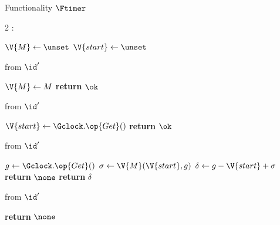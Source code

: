 \begin{interface}[nofloat]{Functionality $\Ftimer$ \\
}

{\scriptsize
\setlength{\columnsep}{1.4em}
\begin{multicols}{2}
:
\begin{algorithmic}[1]
\setcounter{contline}{0}\algcont
\State $\V{M} \gets \unset$
\State $\V{start} \gets \unset$
\algsave
\end{algorithmic}
\vspace{1.4ex}

 \quad from $\id'$
\begin{algorithmic}[1]
\algcont
{} \label{ln:tmrenvonly}
\State $\V{M} \gets M$ \label{ln:tmrskew}
\State \textbf{return} $\ok$
\algsave
\end{algorithmic}
\vspace{1.4ex}

 \quad from $\id'$
\begin{algorithmic}[1]
\algcont
{} \label{ln:tmronce}
\State $\V{start} \gets \Gclock.\op{Get}()$ \label{ln:tmrref}
\State \textbf{return} $\ok$
\algsave
\end{algorithmic}
\vspace{1.4ex}

\columnbreak

 \quad from $\id'$
\begin{algorithmic}[1]
\algcont
{}
\State $g \gets \Gclock.\op{Get}()$
\State $\sigma \gets \V{M}(\V{start}, g)$ \label{ln:tmrrun}
\State $\delta \gets g - \V{start} + \sigma$ \label{ln:tmrskewed}
\If{$\delta > \Delta$} \label{ln:tmrcap}
  \State \textbf{return} $\none$
\EndIf
\State \textbf{return} $\delta$ \label{ln:tmrout}
\algsave
\end{algorithmic}
\vspace{1.4ex}

 \quad from $\id'$
\begin{algorithmic}[1]
\algcont
\State \textbf{return} $\none$ \label{ln:tmrnoleak}
\algsave
\end{algorithmic}
\end{multicols}}
\end{interface}
